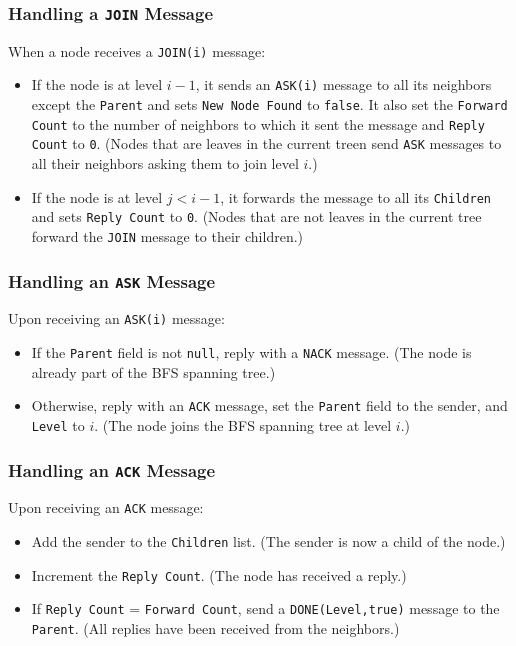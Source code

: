 \subsubsection{Handling a \texttt{JOIN} Message}
When a node receives a \texttt{JOIN(i)} message:
\begin{itemize}
    \item If the node is at level \( i - 1 \), it sends an \texttt{ASK(i)} message to all its neighbors except the \texttt{Parent} and sets \texttt{New Node Found} to \texttt{false}. It also set the \texttt{Forward Count} to the number of neighbors to which it sent the message and \texttt{Reply Count} to \texttt{0}. (Nodes that are leaves in the current treen send \texttt{ASK} messages to all their neighbors asking them to join level \( i \).)
    \item If the node is at level \( j < i - 1 \), it forwards the message to all its \texttt{Children} and sets \texttt{Reply Count} to \texttt{0}. (Nodes that are not leaves in the current tree forward the \texttt{JOIN} message to their children.)
\end{itemize}

\subsubsection{Handling an \texttt{ASK} Message}
Upon receiving an \texttt{ASK(i)} message:
\begin{itemize}
    \item If the \texttt{Parent} field is not \texttt{null}, reply with a \texttt{NACK} message. (The node is already part of the BFS spanning tree.)
    \item Otherwise, reply with an \texttt{ACK} message, set the \texttt{Parent} field to the sender, and \texttt{Level} to \( i \). (The node joins the BFS spanning tree at level \( i \).)
\end{itemize}

\subsubsection{Handling an \texttt{ACK} Message}
Upon receiving an \texttt{ACK} message:
\begin{itemize}
    \item Add the sender to the \texttt{Children} list. (The sender is now a child of the node.)
    \item Increment the \texttt{Reply Count}. (The node has received a reply.)
    \item If \texttt{Reply Count} = \texttt{Forward Count}, send a \texttt{DONE(Level,true)} message to the \texttt{Parent}. (All replies have been received from the neighbors.)
\end{itemize}

